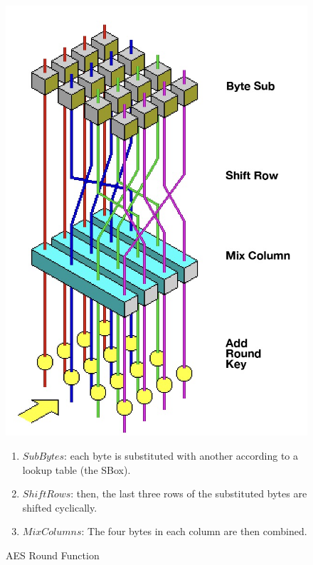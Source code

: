\begin{figure}[htbp]
    \centering
    \begin{minipage}{0.45\textwidth}
        \centering
        \includegraphics[width=\textwidth]{Chapter2/Figures/aes_round_function.jpeg}
        \caption{AES Round Function \cite{Wikipedia_AES_2024}}
        \label{fig:aes_round}
    \end{minipage}%
    \hfill
    \begin{minipage}{0.5\textwidth}
        \begin{enumerate}
            \item $SubBytes$: each byte is substituted with another according to a lookup table (the SBox).
            \item $ShiftRows$: then, the last three rows of the substituted bytes are shifted cyclically.
            \item $MixColumns$: The four bytes in each column are then combined.

\end{enumerate}
\end{minipage}
\end{figure}
